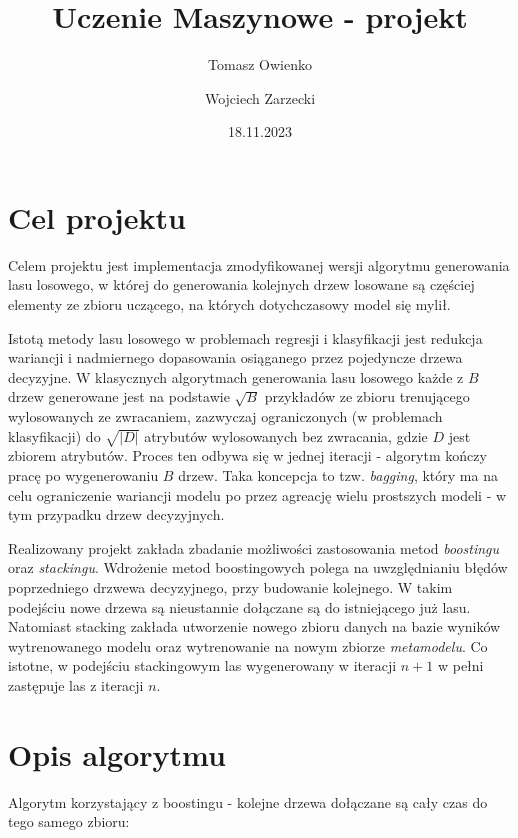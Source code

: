 \documentclass[10pt,a4paper]{article}
\title{Uczenie Maszynowe - projekt}
\author{Tomasz Owienko \and Wojciech Zarzecki}
\date{18.11.2023}
\begin{document}
	
\maketitle	


\section{Cel projektu}

Celem projektu jest implementacja zmodyfikowanej wersji algorytmu generowania lasu losowego, w której do generowania kolejnych drzew losowane są częściej elementy ze zbioru uczącego, na których dotychczasowy model się mylił.

Istotą metody lasu losowego w problemach regresji i klasyfikacji jest redukcja wariancji i nadmiernego dopasowania osiąganego przez pojedyncze drzewa decyzyjne. W klasycznych algorytmach generowania lasu losowego każde z $B$ drzew generowane jest na podstawie $\sqrt{B}$ przykładów ze zbioru trenującego wylosowanych ze zwracaniem, zazwyczaj ograniczonych (w problemach klasyfikacji) do $\sqrt{|D|}$ atrybutów wylosowanych bez zwracania, gdzie $D$ jest zbiorem atrybutów. Proces ten odbywa się w jednej iteracji - algorytm kończy pracę po wygenerowaniu $B$ drzew. Taka koncepcja to tzw. \textit{bagging}, który ma na celu ograniczenie wariancji modelu po przez agreację wielu prostszych modeli - w tym przypadku drzew decyzyjnych.

Realizowany projekt zakłada zbadanie możliwości zastosowania metod \textit{boostingu} oraz \textit{stackingu}. Wdrożenie metod boostingowych polega na uwzględnianiu błędów poprzedniego drzwewa decyzyjnego, przy budowanie kolejnego. W takim podejściu nowe drzewa są nieustannie dołączane są do istniejącego już lasu. Natomiast stacking zakłada utworzenie nowego zbioru danych na bazie wyników wytrenowanego modelu oraz wytrenowanie na nowym zbiorze \textit{metamodelu}. Co istotne, w podejściu stackingowym las wygenerowany w iteracji $n+1$ w pełni zastępuje las z iteracji $n$.

\section{Opis algorytmu}

Algorytm korzystający z boostingu - kolejne drzewa dołączane są cały czas do tego samego zbioru:
\end{document}
